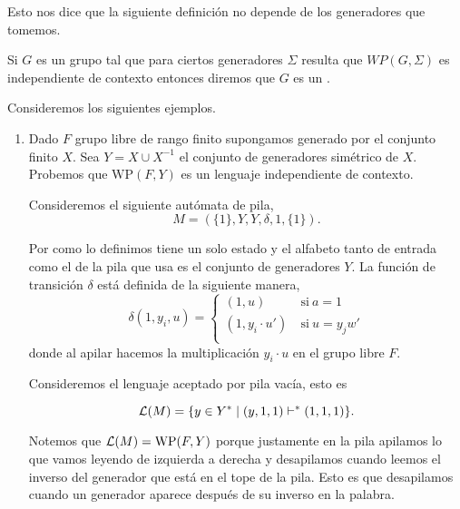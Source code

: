 \documentclass[tesis.tex]{subfiles}
\begin{document}
Esto nos dice que la siguiente definición no depende de los generadores que tomemos.

\begin{deff}
	Si $G$ es un grupo \fg tal que para ciertos generadores $\Sigma$ resulta que $WP(G, \Sigma)$ es independiente de contexto entonces diremos que $G$ es un .
\end{deff}


\begin{ej} Consideremos los siguientes ejemplos.	
	\begin{enumerate}[E1.]
		\item 
		Dado $F$ grupo libre de rango finito supongamos generado por el conjunto finito $X$. 
		Sea  $Y = X \cup X^{-1}$ el conjunto de generadores simétrico de $X$. 
		Probemos que $\text{WP}(F,Y)$ es un lenguaje independiente de contexto.
		
		Consideremos el siguiente autómata de pila,
		\[
		M = (\{ 1 \}, Y, Y, \delta, 1, \{1\}).
		\]
		
		Por como lo definimos tiene un solo estado y el alfabeto tanto de entrada como el de la pila que usa es el conjunto de generadores $Y$.
		La función de transición $\delta$ está definida de la siguiente manera,
		\[
		\delta(1, y_i, u)=\left\{
		\begin{array}{ll}
		(1 , u )  &\ \text{si} \ a = 1  \\
		(1, y_i \cdot u') &\ \text{si} \  u = y_jw'  \\
		\end{array}
		\right.
		\]
		donde al apilar hacemos la multiplicación $y_i \cdot u$ en el grupo libre $F$.
		
		Consideremos el lenguaje aceptado por pila vacía, esto es
		
		\[
		{\cal L }(M) = \{  y \in Y^* \mid (y,1,1)   \vdash^*  (1, 1, 1)  \}.
		\]
		
		Notemos que ${\cal L }(M) = \text{WP}(F,Y)$ porque justamente en la pila apilamos lo que vamos leyendo de izquierda a derecha y desapilamos cuando leemos el inverso del generador que está en el tope de la pila.
		Esto es que desapilamos cuando un generador aparece después de su inverso en la palabra.
		

\end{enumerate}
\end{ej}
\end{document}
